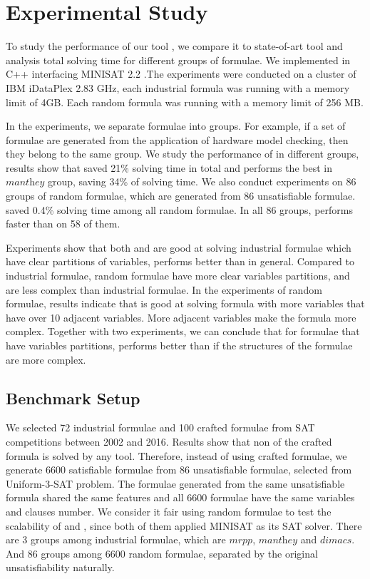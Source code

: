 \section{Experimental Study}\label{sec:expr}
To study the performance of our tool \tool, we compare it to state-of-art tool \minibones and analysis total solving time for different groups of formulae.
We implemented \tool in C++ interfacing MINISAT 2.2 \cite{MINISAT}.The experiments were conducted on a cluster of IBM iDataPlex 2.83 GHz, each industrial formula was running with a memory limit of 4GB. Each random formula was running with a memory limit of 256 MB.

In the experiments, we separate formulae into groups. For example, if a set of formulae are generated from the application of hardware model checking, then they belong to the same group. We study the performance of \tool in different groups, results show that \tool saved 21\% solving time in total and performs the best in $\textit{manthey}$ group, saving 34\% of solving time.
We also conduct experiments on 86 groups of random formulae, which are generated from 86 unsatisfiable formulae.
\tool saved 0.4\% solving time among all random formulae. In all 86 groups, \tool performs faster than \minibones on 58 of them.

Experiments show that both \tool and \minibones are good at solving industrial formulae which have clear partitions of variables, \tool performs better than \minibones in general. Compared to industrial formulae, random formulae have more clear variables partitions, and are less complex than industrial formulae. In the experiments of random formulae, results indicate that \tool is good at solving formula with more variables that have over 10 adjacent variables. More adjacent variables make the formula more complex. Together with two experiments, we can conclude that for formulae that have variables partitions, \tool performs better than \minibones if the structures of the formulae are more complex.

\subsection{Benchmark Setup}

We selected 72 industrial formulae and 100 crafted formulae from SAT competitions between 2002 and 2016. Results show that non of the crafted formula is solved by any tool. Therefore, instead of using crafted formulae, we generate 6600 satisfiable formulae from 86 unsatisfiable formulae, selected from Uniform-3-SAT problem. The formulae generated from the same unsatisfiable formula shared the same features and all 6600 formulae have the same variables and clauses number. We consider it fair using random formulae to test the scalability of \tool and \minibones, since both of them applied MINISAT as its SAT solver.
There are 3 groups among industrial formulae, which are $\textit{mrpp}$, $\textit{manthey}$ and $\textit{dimacs}$. And 86 groups among 6600 random formulae, separated by the original unsatisfiability naturally.

